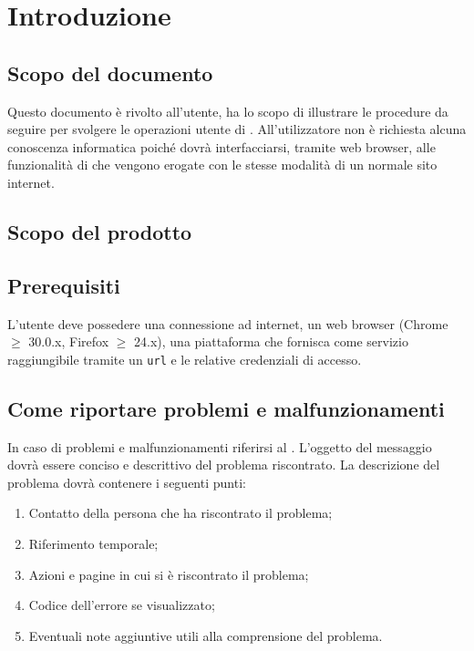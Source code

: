 \section{Introduzione}


	\subsection{Scopo del documento}
	Questo documento è rivolto all'utente, ha lo scopo di illustrare le procedure da seguire per svolgere le operazioni utente di . All'utilizzatore non è richiesta alcuna conoscenza informatica poiché dovrà interfacciarsi, tramite web browser, alle funzionalità di  che vengono erogate con le stesse modalità di un normale sito internet.

	\subsection{Scopo del prodotto}
	\ScopoDelProdotto{}

	\subsection{Prerequisiti}
	L'utente deve possedere una connessione ad internet, un web browser (Chrome $\geq$ 30.0.x, Firefox $\geq$ 24.x), una piattaforma che fornisca  come servizio raggiungibile tramite un \texttt{url} e le relative credenziali di accesso.

	
	\subsection{Come riportare problemi e malfunzionamenti}
	In caso di problemi e malfunzionamenti riferirsi al . L'oggetto del messaggio dovrà essere conciso e descrittivo del problema riscontrato. La descrizione del problema dovrà contenere i seguenti punti:

	\begin{enumerate}
		\item Contatto della persona che ha riscontrato il problema;
		\item Riferimento temporale;
		\item Azioni e pagine in cui si è riscontrato il problema;
		\item Codice dell'errore se visualizzato;
		\item Eventuali note aggiuntive utili alla comprensione del problema.
	\end{enumerate}

